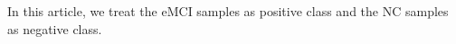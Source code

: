 \documentclass[preprint,12pt]{elsarticle}
\begin{document}
In this article, we treat the eMCI samples as positive class and the NC samples as negative class.
\end{document}
